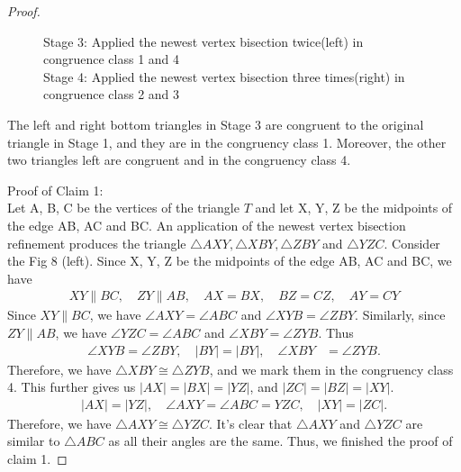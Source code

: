 \begin{proof}
\begin{figure}[h!]
\begin{tikzpicture}[scale=0.8]
      \end{tikzpicture}
    \caption{Stage 3: Applied the newest vertex bisection twice(left) in congruence class 1 and 4\\Stage 4: Applied the newest vertex bisection three times(right) in congruence class 2 and 3}
    \label{fig6: sub2}
    \end{figure}

    \begin{claim}
    The left and right bottom triangles in Stage 3 are congruent to the original triangle in Stage 1, and they are in the congruency class 1. Moreover, the other two triangles left are congruent and in the congruency class 4.
    \end{claim}
    \noindent
    Proof of Claim 1: \\
    Let A, B, C be the vertices of the triangle $T$ and let X, Y, Z be the midpoints of the edge AB, AC and BC. An application of the newest vertex bisection refinement produces the triangle $\triangle{AXY}, \triangle{XBY}, \triangle{ZBY}$ and $\triangle{YZC}$. Consider the Fig 8 (left).
    Since X, Y, Z be the midpoints of the edge AB, AC and BC, we have 
    \begin{align*}
     XY \parallel BC,
     \quad 
     ZY \parallel AB,
     \quad 
     AX = BX, 
     \quad 
     BZ = CZ, 
     \quad
     AY = CY
    \end{align*}
    Since $XY\parallel BC$, we have $\angle{AXY} = \angle{ABC}$ and $\angle{XYB} = \angle{ZBY}$. Similarly, since $ZY\parallel AB$, we have $\angle{YZC} = \angle{ABC}$ and $\angle{XBY} = \angle{ZYB}$. Thus 
    \begin{align*}
    \angle{XYB} = \angle{ZBY},
    \quad
    |BY| = |BY|,
    \quad
    \angle{XBY} &= \angle{ZYB}.
    \end{align*}
    Therefore, we have $\triangle{XBY} \cong \triangle{ZYB}$, and we mark them in the congruency class 4. This further gives us $|AX| = |BX| = |YZ|$, and $|ZC| = |BZ| = |XY|$.
    \begin{align*}
    |AX| = |YZ|,
    \quad
    \angle{AXY} = \angle{ABC} = {YZC},
    \quad
    |XY| = |ZC|.
    \end{align*}
    Therefore, we have $\triangle{AXY} \cong \triangle{YZC}$. It's clear that $\triangle{AXY}$ and $\triangle{YZC}$ are similar to $\triangle{ABC}$ as all their angles are the same. Thus, we finished the proof of claim 1.


\end{proof}
